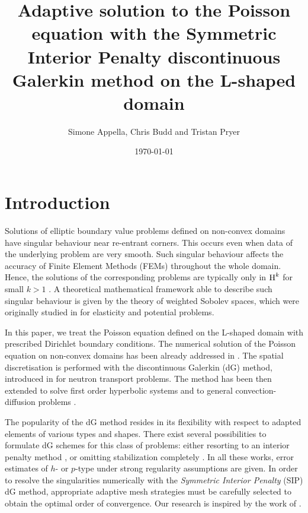 \documentclass[a4paper,11pt]{article}
\title{Adaptive solution to the Poisson equation with the Symmetric Interior Penalty discontinuous Galerkin method on the L-shaped domain}
\author{Simone Appella, Chris Budd and Tristan Pryer}
\date{\today}
\begin{document}
\maketitle


\section{Introduction}

Solutions of elliptic boundary value problems defined on non-convex domains have singular behaviour near re-entrant corners. This occurs even when data of the underlying problem are very smooth. Such singular behaviour affects the accuracy of Finite Element Methods (FEMs) throughout the whole domain. Hence, the solutions of the corresponding problems are typically only in $\operatorname H^{k}$ for small $k>1$ \cite{BG:1988,BG:1989}. A theoretical mathematical framework able to describe such singular behaviour is given by the theory of weighted Sobolev spaces, which were originally studied in \cite{BR:1972,BKP:1979} for elasticity and potential problems.

In this paper, we treat the Poisson equation defined on the L-shaped domain with prescribed Dirichlet boundary conditions. The numerical solution of the Poisson equation on non-convex domains has been already addressed in \cite{CKW:2002,SH:2016,ZS:2002}. The spatial discretisation is performed with the discontinuous Galerkin (dG) method, introduced in \cite{Reed:1973} for neutron transport problems. The method has been then extended to solve first order hyperbolic systems and to general convection-diffusion problems \cite{Cockburn:1998,Cockburn:2001}.

The popularity of the dG method resides in its flexibility with respect to adapted elements of various types and shapes. There exist several possibilities to formulate dG schemes for this class of problems: either resorting to an interior penalty method \cite{AD:1982,ABCM:2000,ABCM:2002}, or omitting stabilization
completely \cite{Richter:1992}. In all these works, error estimates of $h$- or $p$-type under strong regularity assumptions are given. In order to resolve the singularities numerically with the \textit{Symmetric Interior Penalty} (SIP) dG method, appropriate adaptive mesh strategies must be carefully selected to obtain the optimal order of convergence. Our research is inspired by the work of \cite{Wihler:2003,Schwab:1998}.\\
\end{document}
